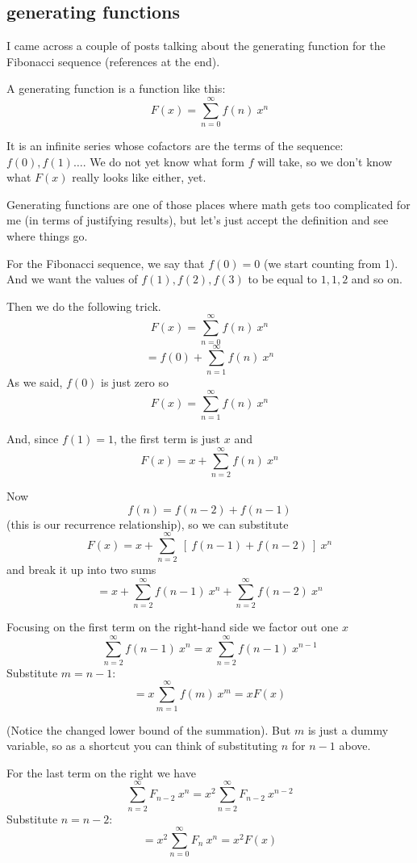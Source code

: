 \documentclass[11pt, oneside]{article}
\begin{document}
\subsection*{generating functions}

I came across a couple of posts talking about the generating function for the Fibonacci sequence (references at the end).

A generating function is a function like this:
\[ F(x) = \sum_{n=0}^{\infty} f(n) \ x^n \]

It is an infinite series whose cofactors are the terms of the sequence:  $f(0), f(1) \dots$.  We do not yet know what form $f$ will take, so we don't know what $F(x)$ really looks like either, yet.

Generating functions are one of those places where math gets too complicated for me (in terms of justifying results), but let's just accept the definition and see where things go.

For the Fibonacci sequence, we say that $f(0) = 0$ (we start counting from 1).   And we want the values of $f(1), f(2), f(3)$ to be equal to $1,1,2$ and so on.

Then we do the following trick.
\[ F(x) =  \sum_{n=0}^{\infty} f(n) \ x^n \]
\[  = f(0) + \sum_{n=1}^{\infty} f(n) \ x^n \]
As we said, $f(0)$ is just zero so
\[ F(x) = \sum_{n=1}^{\infty} f(n) \ x^n \]

And, since $f(1) = 1$, the first term is just $x$ and
\[ F(x) = x + \sum_{n=2}^{\infty} f(n) \ x^n \]

Now
\[ f(n) = f(n-2) + f(n-1) \]
 (this is our recurrence relationship), so we can substitute
\[ F(x) = x + \sum_{n=2}^{\infty} \ [ \ f(n-1) +  f(n-2) \ ] \   x^n \]
and break it up into two sums
\[ = x +  \sum_{n=2}^{\infty} f(n-1) \ x^n +  \sum_{n=2}^{\infty} f(n-2) \ x^n \]

Focusing on the first term on the right-hand side we factor out one $x$
\[ \sum_{n=2}^{\infty} f(n-1) \ x^n = x \ \sum_{n=2}^{\infty} f(n-1) \ x^{n-1}\]
Substitute $m = n-1$:
\[ =  x \sum_{m=1}^{\infty} f(m) \ x^{m} = x F(x) \]

(Notice the changed lower bound of the summation).  But $m$ is just a dummy variable, so as a shortcut you can think of substituting $n$ for $n-1$ above.

For the last term on the right we have
\[  \sum_{n=2}^{\infty} F_{n-2} \ x^n = x^2  \sum_{n=2}^{\infty} F_{n-2} \ x^{n-2}\]
Substitute $n = n - 2$:
\[ =  x^2 \sum_{n=0}^{\infty} F_n \ x^n = x^2 F(x) \]
\end{document}
